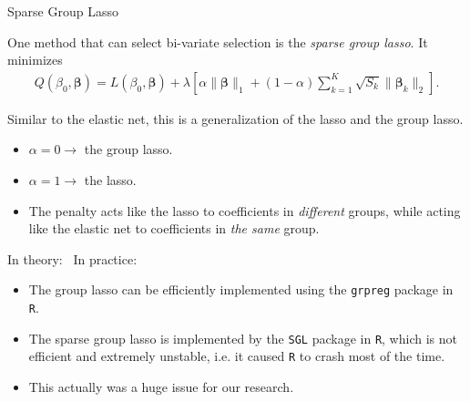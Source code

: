 \documentclass[8pt]{beamer}
\newcommand{\mys}{\vspace{0.5cm} %
}
\newcommand{\mysa}{\vspace{0.2cm} %
}
\begin{document}
\begin{frame}{Sparse Group Lasso}

One method that can select bi-variate selection is the \textit{sparse group lasso}. It minimizes 
\begin{align}
    \label{sparsegrouoplasso}
    Q(\beta_0, \bm{\beta}) = L(\beta_0, \bm{\beta}) + \lambda \left[ \alpha \| \bm{\beta} \|_1 + (1 - \alpha) \sum_{k=1}^K \sqrt{S_k}  \| \bm{\beta}_k \|_2 \right].
\end{align} \mysa

Similar to the elastic net, this is a generalization of the lasso and the group lasso.
\begin{itemize}
    \item $\alpha = 0 \to$ the group lasso.
    \item $\alpha = 1 \to$ the lasso.
    \item The penalty acts like the lasso to coefficients in \textit{different} groups, while acting like the elastic net to coefficients in \textit{the same} group.
\end{itemize} \mys

In theory: \Laughey[1.5][yellow][pink] ~In practice: \Vomey[1.5][yellow][Green]
\begin{itemize}
    \item The group lasso can be efficiently implemented using the \texttt{grpreg} package in \texttt{R}.
    \item The sparse group lasso is implemented by the \texttt{SGL} package in \texttt{R}, which is not efficient and extremely unstable, i.e. it caused \texttt{R} to crash most of the time.
    \item This actually was a huge issue for our research.
\end{itemize}
    
\end{frame}
\end{document}
